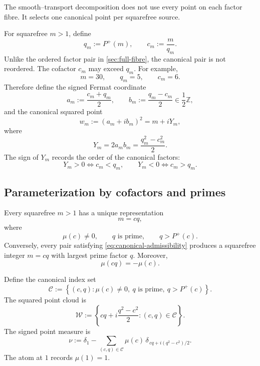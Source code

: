 \documentclass[11pt]{article}
\theoremstyle{definition}
\newcommand{\Pplus}{P^{+}}
\newcommand{\1}{\mathbf{1}}
\newcommand{\Z}{\mathbb{Z}}
\begin{document}
The smooth--transport decomposition does not use every point on each factor fibre.  It selects one canonical point per squarefree source.

For squarefree $m>1$, define
\begin{equation}
 q_m:=\Pplus(m),
 \qquad
 c_m:=\frac{m}{q_m}.
 \label{eq:canonical-cq}
\end{equation}
Unlike the ordered factor pair in \cref{sec:full-fibre}, the canonical pair is not reordered.  The cofactor $c_m$ may exceed $q_m$.  For example,
\[
 m=30,
 \qquad
 q_m=5,
 \qquad
 c_m=6.
\]
Therefore define the signed Fermat coordinate
\begin{equation}
 a_m:=\frac{c_m+q_m}{2},
 \qquad
 b_m:=\frac{q_m-c_m}{2}\in\frac12\Z,
 \label{eq:signed-Fermat}
\end{equation}
and the canonical squared point
\begin{equation}
 w_m:=(a_m+ib_m)^2
 =m+iY_m,
 \label{eq:canonical-w}
\end{equation}
where
\begin{equation}
 \boxed{Y_m=2a_mb_m=\frac{q_m^2-c_m^2}{2}.}
 \label{eq:signed-Y}
\end{equation}
The sign of $Y_m$ records the order of the canonical factors:
\begin{equation}
 Y_m>0\iff c_m<q_m,
 \qquad
 Y_m<0\iff c_m>q_m.
 \label{eq:Y-sign}
\end{equation}

\subsection{Parameterization by cofactors and primes}

Every squarefree $m>1$ has a unique representation
\begin{equation}
 m=cq,
 \label{eq:cq-general}
\end{equation}
where
\begin{equation}
 \mu(c)\ne0,
 \qquad
 q\text{ is prime},
 \qquad
 q>\Pplus(c).
 \label{eq:canonical-admissibility}
\end{equation}
Conversely, every pair satisfying \cref{eq:canonical-admissibility} produces a squarefree integer $m=cq$ with largest prime factor $q$.  Moreover,
\begin{equation}
 \mu(cq)=-\mu(c).
 \label{eq:canonical-sign}
\end{equation}

Define the canonical index set
\begin{equation}
 \mathscr C
 :=
 \left\{
 (c,q):
 \mu(c)\ne0,
 \ q\text{ is prime},
 \ q>\Pplus(c)
 \right\}.
 \label{eq:canonical-index}
\end{equation}
The squared point cloud is
\begin{equation}
 \mathscr W
 :=
 \left\{
 cq+i\frac{q^2-c^2}{2}:(c,q)\in\mathscr C
 \right\}.
 \label{eq:canonical-cloud}
\end{equation}
The signed point measure is
\begin{equation}
 \nu
 :=
 \delta_1
 -
 \sum_{(c,q)\in\mathscr C}
 \mu(c)\,
 \delta_{\,cq+i(q^2-c^2)/2}.
 \label{eq:signed-measure}
\end{equation}
The atom at $1$ records $\mu(1)=1$.
\end{document}

